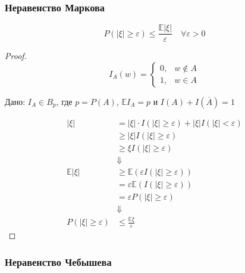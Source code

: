 \subsubsection{Неравенство Маркова}

\begin{theorem}
    \[P(|\xi| \geq \varepsilon) \leq \frac{\mathbb{E}|\xi|}{\varepsilon} \quad \forall \varepsilon > 0\]
\end{theorem}
\begin{proof}
    \[I_A(w) = \begin{cases}
            0, & w \notin A \\
            1, & w \in A
        \end{cases}\]

    Дано: \(I_A \in B_p\), где \(p = P(A)\), \(\mathbb{E}I_A = p\) и \(I(A) + I(\overline A) = 1\)

    \begin{align}
        |\xi|                     & = |\xi| \cdot I(|\xi| \geq \varepsilon) + |\xi| I(|\xi| < \varepsilon) \\
                                  & \geq |\xi| I(|\xi| \geq \varepsilon)                                   \\
                                  & \geq \xi I(|\xi| \geq \varepsilon)                                     \\
                                  & \Downarrow                                                             \\
        \mathbb{E}|\xi|           & \geq \mathbb{E}(\varepsilon I(|\xi| \geq \varepsilon))                 \\
                                  & = \varepsilon \mathbb{E}(I(|\xi| \geq \varepsilon))                    \\
                                  & = \varepsilon P(|\xi| \geq \varepsilon)                                \\
                                  & \Downarrow                                                             \\
        P(|\xi| \geq \varepsilon) & \leq \frac{\mathbb{E}\xi}{\varepsilon}
    \end{align}
\end{proof}

\subsubsection{Неравенство Чебышева}

